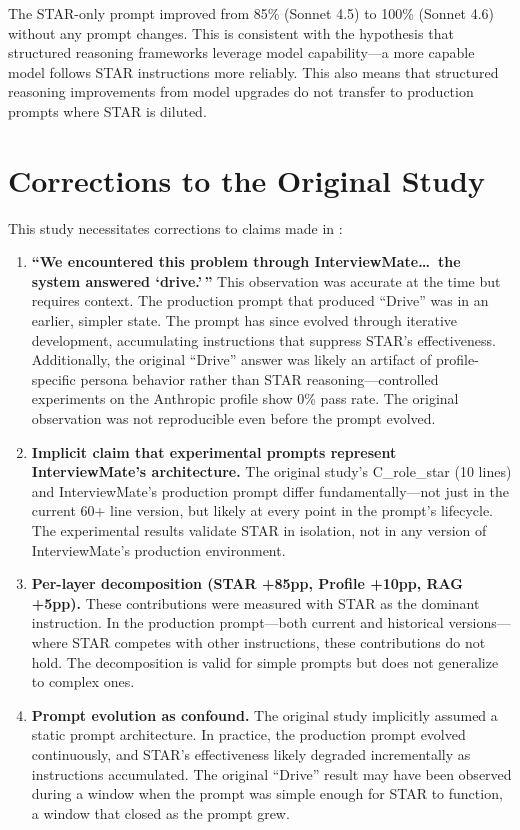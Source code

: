 \documentclass[11pt]{article}
\begin{document}
The STAR-only prompt improved from 85\% (Sonnet 4.5) to 100\% (Sonnet 4.6) without any prompt changes. This is consistent with the hypothesis that structured reasoning frameworks leverage model capability---a more capable model follows STAR instructions more reliably. This also means that structured reasoning improvements from model upgrades do not transfer to production prompts where STAR is diluted.

\section{Corrections to the Original Study}

This study necessitates corrections to claims made in \citet{jo2026}:

\begin{enumerate}[leftmargin=2em]
\item \textbf{``We encountered this problem through InterviewMate\ldots\ the system answered `drive.'\,''} This observation was accurate at the time but requires context. The production prompt that produced ``Drive'' was in an earlier, simpler state. The prompt has since evolved through iterative development, accumulating instructions that suppress STAR's effectiveness. Additionally, the original ``Drive'' answer was likely an artifact of profile-specific persona behavior rather than STAR reasoning---controlled experiments on the Anthropic profile show 0\% pass rate. The original observation was not reproducible even before the prompt evolved.

\item \textbf{Implicit claim that experimental prompts represent InterviewMate's architecture.} The original study's C\_role\_star (10 lines) and InterviewMate's production prompt differ fundamentally---not just in the current 60+ line version, but likely at every point in the prompt's lifecycle. The experimental results validate STAR in isolation, not in any version of InterviewMate's production environment.

\item \textbf{Per-layer decomposition (STAR +85pp, Profile +10pp, RAG +5pp).} These contributions were measured with STAR as the dominant instruction. In the production prompt---both current and historical versions---where STAR competes with other instructions, these contributions do not hold. The decomposition is valid for simple prompts but does not generalize to complex ones.

\item \textbf{Prompt evolution as confound.} The original study implicitly assumed a static prompt architecture. In practice, the production prompt evolved continuously, and STAR's effectiveness likely degraded incrementally as instructions accumulated. The original ``Drive'' result may have been observed during a window when the prompt was simple enough for STAR to function, a window that closed as the prompt grew.
\end{enumerate}
\end{document}
